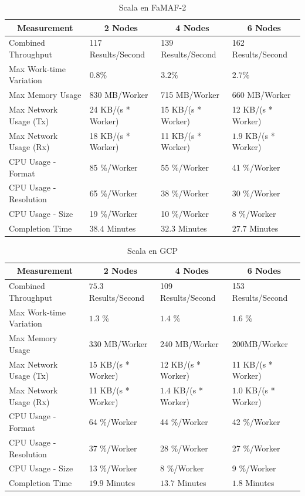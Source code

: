\documentclass[11pt]{article}
\begin{document}
\begin{table}[H]
\centering
\begin{tabular}{|l|l|l|l|}
\hline
\multicolumn{1}{|c|}{Measurement} & \multicolumn{1}{c|}{2 Nodes} & \multicolumn{1}{c|}{4 Nodes} & \multicolumn{1}{c|}{6 Nodes} \\ \hline
Combined Throughput & 117 Results/Second & 139 Results/Second & 162 Results/Second \\ \hline
Max Work-time Variation & $0.8\%$& $3.2\%$& $2.7\%$\\ \hline
Max Memory Usage & 830 MB/Worker & 715 MB/Worker & 660 MB/Worker \\ \hline
Max Network Usage (Tx) & 24 KB/(s * Worker) & 15 KB/(s * Worker) & 12 KB/(s * Worker) \\ \hline
Max Network Usage (Rx) & 18 KB/(s * Worker) & 11 KB/(s * Worker) & $1.9$ KB/(s * Worker) \\ \hline
CPU Usage - Format & 85 \%/Worker & 55 \%/Worker & 41 \%/Worker \\ \hline
CPU Usage - Resolution & 65 \%/Worker & 38 \%/Worker & 30 \%/Worker \\ \hline
CPU Usage - Size & 19 \%/Worker & 10 \%/Worker & 8 \%/Worker \\ \hline
Completion Time & $38.4$ Minutes & $32.3$ Minutes & $27.7$ Minutes \\ \hline
\end{tabular}
\caption{Scala en FaMAF-2}
\end{table}

\begin{table}[H]
\centering
\begin{tabular}{|l|l|l|l|}
\hline
\multicolumn{1}{|c|}{Measurement} & \multicolumn{1}{c|}{2 Nodes} & \multicolumn{1}{c|}{4 Nodes} & \multicolumn{1}{c|}{6 Nodes} \\ \hline
Combined Throughput & $75.3$ Results/Second & 109 Results/Second & 153 Results/Second \\ \hline
Max Work-time Variation & $1.3$ \% & $1.4$ \% & $1.6$ \% \\ \hline
Max Memory Usage & 330 MB/Worker & 240 MB/Worker & 200MB/Worker \\ \hline
Max Network Usage (Tx) & 15 KB/(s * Worker) & 12 KB/(s * Worker) & 11 KB/(s * Worker) \\ \hline
Max Network Usage (Rx) & 11 KB/(s * Worker) & $1.4$ KB/(s * Worker) & $1.0$ KB/(s * Worker) \\ \hline
CPU Usage - Format & 64 \%/Worker & 44 \%/Worker & 42 \%/Worker \\ \hline
CPU Usage - Resolution & 37 \%/Worker & 28 \%/Worker & 27 \%/Worker \\ \hline
CPU Usage - Size & 13 \%/Worker & 8 \%/Worker & 9 \%/Worker \\ \hline
Completion Time & $19.9$ Minutes & $13.7$ Minutes & $1.8$ Minutes \\ \hline
\end{tabular}
\caption{Scala en GCP}
\end{table}
\end{document}
